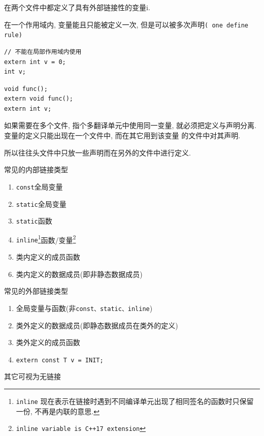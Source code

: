 

在两个文件中都定义了具有外部链接性的变量i.

在一个作用域内, 变量能且只能被定义一次, 但是可以被多次声明{\tt( one define rule)}
\begin{paracol}{2}
	\begin{leftcolumn}
		\begin{lstlisting}[title=定义,xleftmargin=2em,xrightmargin=2em]
// 不能在局部作用域内使用
extern int v = 0; 
int v;
		\end{lstlisting}
	\end{leftcolumn}
	\begin{rightcolumn}
		\begin{lstlisting}[title=声明,xleftmargin=2em,xrightmargin=2em]
void func();
extern void func();
extern int v;
		\end{lstlisting}
	\end{rightcolumn}
\end{paracol}

如果需要在多个文件, 指个多翻译单元中使用同一变量, 就必须把定义与声明分离. 变量的定义只能出现在一个文件中, 而在其它用到该变量
	的文件中对其声明.

所以往往头文件中只放一些声明而在另外的文件中进行定义.

\begin{paracol}{2}
	\begin{leftcolumn}
		常见的内部链接类型
		\begin{enumerate}
			\item {\tt const}全局变量
			\item {\tt static}全局变量
			\item {\tt static}函数
			\item {\tt inline}\footnote[1]{{\tt inline} 现在表示在链接时遇到不同编译单元出现了相同签名的函数时只保留一份, 不再是内联的意思.}函数/变量\footnote[2]{{\tt inline variable is C++17 extension}}
			\item 类内定义的成员函数
			\item 类内定义的数据成员(即非静态数据成员)
		\end{enumerate}
	\end{leftcolumn}
	\begin{rightcolumn}
		常见的外部链接类型
		\begin{enumerate}
			\item 全局变量与函数(非{\tt const、static、inline})
			\item 类外定义的数据成员(即静态数据成员在类外的定义)
			\item 类外定义的成员函数
			\item {\tt extern const T v = INIT;}
		\end{enumerate}
	\end{rightcolumn}
\end{paracol}
其它可视为无链接

